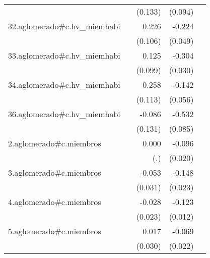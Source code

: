 {\begin{longtable}{l*{4}{D{.}{.}{-1}}}
            &                     &     (0.133)         &     (0.094)         &                     \\
\addlinespace
32.aglomerado#c.hv\_miemhabi&                     &       0.226\sym{*}  &      -0.224\sym{***}&                     \\
            &                     &     (0.106)         &     (0.049)         &                     \\
\addlinespace
33.aglomerado#c.hv\_miemhabi&                     &       0.125         &      -0.304\sym{***}&                     \\
            &                     &     (0.099)         &     (0.030)         &                     \\
\addlinespace
34.aglomerado#c.hv\_miemhabi&                     &       0.258\sym{*}  &      -0.142\sym{*}  &                     \\
            &                     &     (0.113)         &     (0.056)         &                     \\
\addlinespace
36.aglomerado#c.hv\_miemhabi&                     &      -0.086         &      -0.532\sym{***}&                     \\
            &                     &     (0.131)         &     (0.085)         &                     \\
\addlinespace
2.aglomerado#c.miembros&                     &       0.000         &      -0.096\sym{***}&                     \\
            &                     &         (.)         &     (0.020)         &                     \\
\addlinespace
3.aglomerado#c.miembros&                     &      -0.053         &      -0.148\sym{***}&                     \\
            &                     &     (0.031)         &     (0.023)         &                     \\
\addlinespace
4.aglomerado#c.miembros&                     &      -0.028         &      -0.123\sym{***}&                     \\
            &                     &     (0.023)         &     (0.012)         &                     \\
\addlinespace
5.aglomerado#c.miembros&                     &       0.017         &      -0.069\sym{**} &                     \\
            &                     &     (0.030)         &     (0.022)         &                     \\

\end{longtable}}
